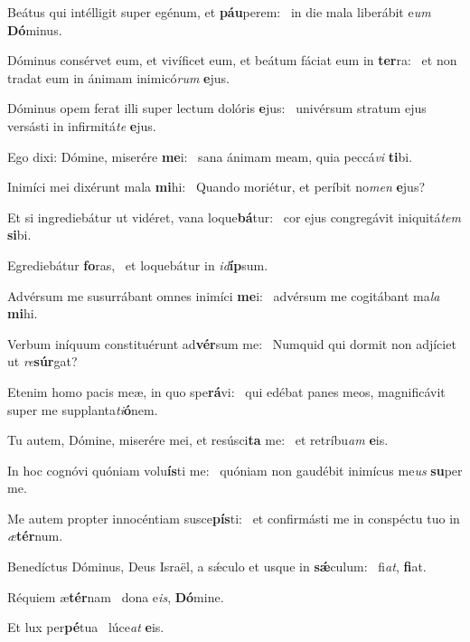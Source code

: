 \item Beátus qui intélligit super egénum, et \textbf{páu}perem:~\psstar{} in die mala liberábit e\textit{um} \textbf{Dó}minus.
\item Dóminus consérvet eum, et vivíficet eum, et beátum fáciat eum in \textbf{ter}ra:~\psstar{} et non tradat eum in ánimam inimicó\textit{rum} \textbf{e}jus.
\item Dóminus opem ferat illi super lectum dolóris \textbf{e}jus:~\psstar{} univérsum stratum ejus versásti in infirmitá\textit{te} \textbf{e}jus.
\item Ego dixi: Dómine, miserére \textbf{me}i:~\psstar{} sana ánimam meam, quia peccá\textit{vi} \textbf{ti}bi.
\item Inimíci mei dixérunt mala \textbf{mi}hi:~\psstar{} Quando moriétur, et períbit no\textit{men} \textbf{e}jus?
\item Et si ingrediebátur ut vidéret, vana loque\textbf{bá}tur:~\psstar{} cor ejus congregávit iniquitá\textit{tem} \textbf{si}bi.
\item Egrediebátur \textbf{fo}ras,~\psstar{} et loquebátur in \textit{id}\textbf{íp}sum.
\item Advérsum me susurrábant omnes inimíci \textbf{me}i:~\psstar{} advérsum me cogitábant ma\textit{la} \textbf{mi}hi.
\item Verbum iníquum constituérunt ad\textbf{vér}sum me:~\psstar{} Numquid qui dormit non adjíciet ut \textit{re}\textbf{súr}gat?
\item Etenim homo pacis meæ, in quo spe\textbf{rá}vi:~\psstar{} qui edébat panes meos, magnificávit super me supplanta\textit{ti}\textbf{ó}nem.
\item Tu autem, Dómine, miserére mei, et resúsci\textbf{ta} me:~\psstar{} et retríbu\textit{am} \textbf{e}is.
\item In hoc cognóvi quóniam volu\textbf{ís}ti me:~\psstar{} quóniam non gaudébit inimícus me\textit{us} \textbf{su}per me.
\item Me autem propter innocéntiam susce\textbf{pís}ti:~\psstar{} et confirmásti me in conspéctu tuo in \textit{æ}\textbf{tér}num.
\item Benedíctus Dóminus, Deus Israël, a sǽculo et usque in \textbf{sǽ}culum:~\psstar{} fi\textit{at}, \textbf{fi}at.
\item Réquiem æ\textbf{tér}nam~\psstar{} dona e\textit{is}, \textbf{Dó}mine.
\item Et lux per\textbf{pé}tua~\psstar{} lúce\textit{at} \textbf{e}is.